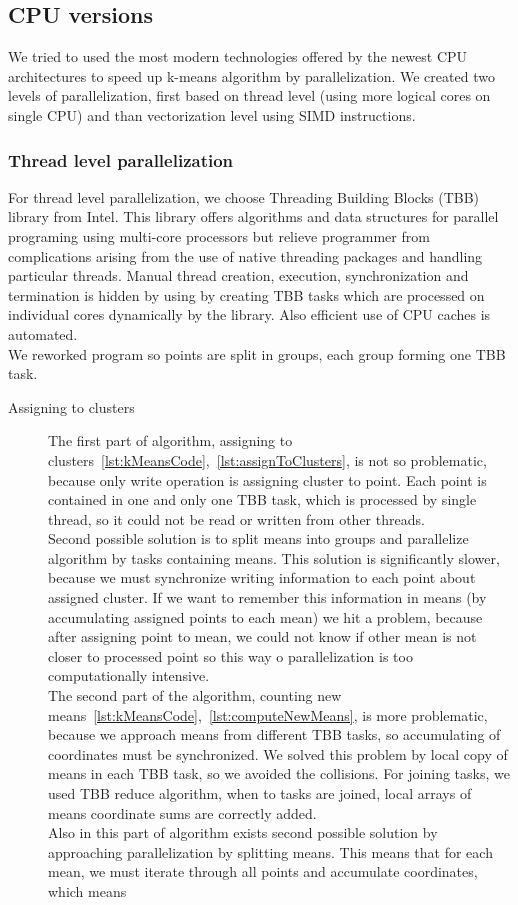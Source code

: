 \subsection{CPU versions}
We tried to used the most modern technologies offered by the newest CPU architectures to speed up k-means algorithm by parallelization. We created two levels of parallelization, first based on thread level (using more logical cores on single CPU) and than vectorization level using SIMD instructions.

\subsubsection{Thread level parallelization}
For thread level parallelization, we choose Threading Building Blocks (TBB) library from Intel. This library offers algorithms and data structures for parallel programing using multi-core processors but relieve programmer from complications arising from the use of native threading packages and handling particular threads. Manual thread creation, execution, synchronization and termination is hidden by using by creating TBB tasks which are processed on individual cores dynamically by the library. Also efficient use of CPU caches is automated.\\
We reworked program so points are split in groups, each group forming one TBB task.\\
\begin{description}
\item[Assigning to clusters]The first part of algorithm, assigning to clusters~\autoref{lst:kMeansCode},~\autoref{lst:assignToClusters}, is not so problematic, because only write operation is assigning cluster to point. Each point is contained in one and only one TBB task, which is processed by single thread, so it could not be read or written from other threads.\\
Second possible solution is to split means into groups and parallelize algorithm by tasks containing means. This solution is significantly slower, because we must synchronize writing information to each point about assigned cluster. If we want to remember this information in means (by accumulating assigned points to each mean) we hit a problem, because after assigning point to mean, we could not know if other mean is not closer to processed point so this way o parallelization is too computationally intensive.\\
The second part of the algorithm, counting new means~\autoref{lst:kMeansCode},~\autoref{lst:computeNewMeans}, is more problematic, because we approach means from different TBB tasks, so accumulating of coordinates must be synchronized. We solved this problem by local copy of means in each TBB task, so we avoided the collisions. For joining tasks, we used TBB reduce algorithm, when to tasks are joined, local arrays of means coordinate sums are correctly added.\\
Also in this part of algorithm exists second possible solution by approaching parallelization by splitting means. This means that for each mean, we must iterate through all points and accumulate coordinates, which means 
\end{description}
